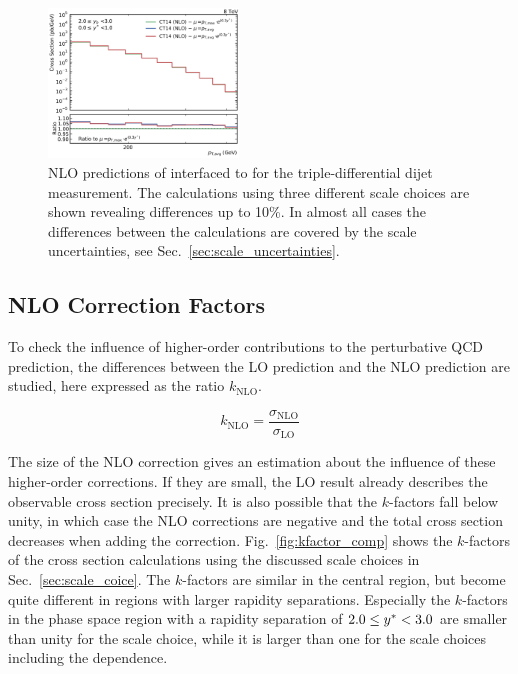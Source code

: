 \begin{figure}[htp]
    \includegraphics[width=0.45\textwidth]{figures/theory/nlo_xs_comp_yb2ys0.pdf}
    \caption[fastNLO prediction of triple-differential dijet cross section]{
        NLO predictions of \fastNLO interfaced to \NLOJETPP for the
        triple-differential dijet measurement. The calculations using three
        different scale choices are shown revealing differences up to 10\%. In
        almost all cases the differences between the calculations are covered by
        the scale uncertainties, see Sec.~\ref{sec:scale_uncertainties}.}
    \label{fig:xs_nlo_comp}
\end{figure}


\subsection{NLO Correction Factors}
\label{sec:k_factors}

To check the influence of higher-order contributions to the perturbative QCD
prediction, the differences between the LO prediction and the NLO
prediction are studied, here expressed as the ratio $k_\mathrm{NLO}$.

\begin{equation*}
    k_{\mathrm{NLO}} = \frac{\sigma_{\mathrm{NLO}}}{\sigma_{\mathrm{LO}}}
\end{equation*}

The size of the NLO correction gives an estimation about the influence of these
higher-order corrections. If they are small, the LO result already describes the
observable cross section precisely. It is also possible that the $k$-factors
fall below unity, in which case the NLO corrections are negative and the total cross
section decreases when adding the correction.  Fig.~\ref{fig:kfactor_comp} shows
the $k$-factors of the \NLOJETPP cross section calculations using the discussed
scale choices in Sec.~\ref{sec:scale_coice}. The $k$-factors are similar in the
central region, but become quite different in regions with larger rapidity
separations.  Especially the $k$-factors in the phase space region with a
rapidity separation of $2.0 \leq y^* < 3.0$ are smaller than unity for the
\ptavg scale choice, while it is larger than one for the scale choices including
the \ystar dependence.

